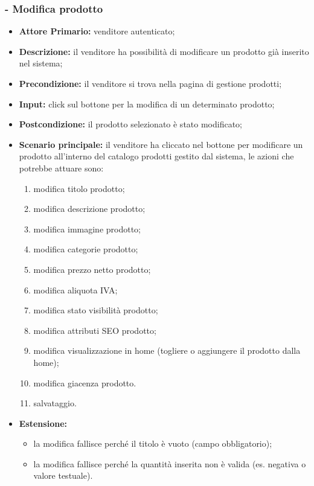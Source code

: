 \stepsubUserCase
\subsubsection{- Modifica  prodotto}
\begin{itemize}
    \item \textbf{Attore Primario:} venditore autenticato;
    \item \textbf{Descrizione:} il venditore ha possibilità di modificare un prodotto già inserito nel sistema;
    \item \textbf{Precondizione:} il venditore si trova nella pagina di gestione prodotti;
    \item \textbf{Input:} click sul bottone per la modifica di un determinato prodotto;
    \item \textbf{Postcondizione:} il prodotto selezionato è stato modificato;
    \item \textbf{Scenario principale:} il venditore ha cliccato nel bottone per modificare un prodotto all’interno del catalogo prodotti gestito dal sistema, le azioni che potrebbe attuare sono: 
    \begin{enumerate}
        \item modifica titolo prodotto;
        \item modifica descrizione prodotto;
        \item modifica immagine prodotto;
        \item modifica categorie prodotto;
        \item modifica prezzo netto prodotto;
        \item modifica aliquota IVA;
        \item modifica stato visibilità prodotto; 
        \item modifica attributi SEO prodotto;
        \item modifica visualizzazione in home (togliere o aggiungere il prodotto dalla home);
        \item modifica giacenza prodotto.
        \item salvataggio.
    \end{enumerate}
    \item \textbf{Estensione:}
    \begin{itemize}
        \item la modifica fallisce perché il titolo è vuoto (campo obbligatorio);
        \item la modifica fallisce perché la quantità inserita non è valida (es. negativa o valore testuale).
    \end{itemize}
\end{itemize}

